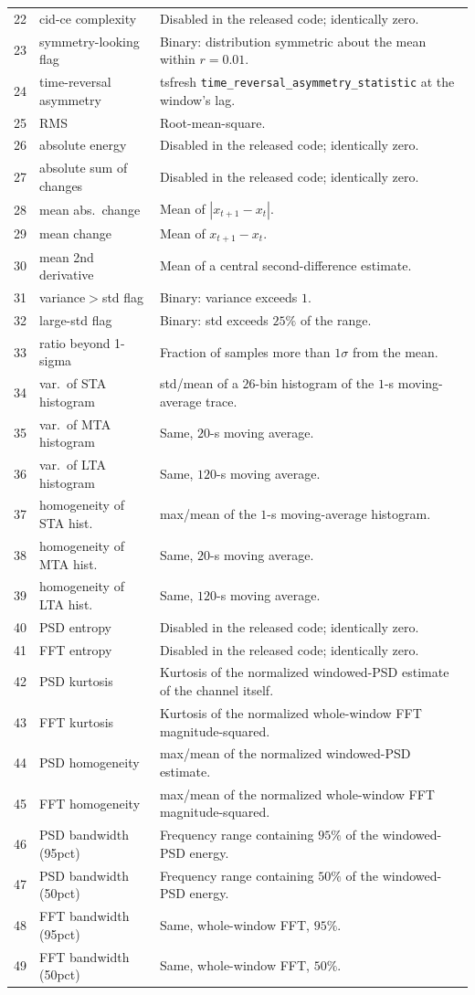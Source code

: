 \documentclass[11pt,a4paper]{article}
\begin{document}
\begin{longtable}{@{}p{0.5cm}p{5.8cm}p{7.8cm}@{}}
22 & cid-ce complexity & Disabled in the released code; identically zero. \\
23 & symmetry-looking flag & Binary: distribution symmetric about the mean within $r=0.01$. \\
24 & time-reversal asymmetry & tsfresh \texttt{time\_reversal\_asymmetry\_statistic} at the window's lag. \\
25 & RMS & Root-mean-square. \\
26 & absolute energy & Disabled in the released code; identically zero. \\
27 & absolute sum of changes & Disabled in the released code; identically zero. \\
28 & mean abs.\ change & Mean of $|x_{t+1}-x_t|$. \\
29 & mean change & Mean of $x_{t+1}-x_t$. \\
30 & mean 2nd derivative & Mean of a central second-difference estimate. \\
31 & variance$>$std flag & Binary: variance exceeds $1$. \\
32 & large-std flag & Binary: std exceeds $25\%$ of the range. \\
33 & ratio beyond 1-sigma & Fraction of samples more than $1\sigma$ from the mean. \\
34 & var.\ of STA histogram & std/mean of a $26$-bin histogram of the $1$-s moving-average trace. \\
35 & var.\ of MTA histogram & Same, $20$-s moving average. \\
36 & var.\ of LTA histogram & Same, $120$-s moving average. \\
37 & homogeneity of STA hist.\ & max/mean of the $1$-s moving-average histogram. \\
38 & homogeneity of MTA hist.\ & Same, $20$-s moving average. \\
39 & homogeneity of LTA hist.\ & Same, $120$-s moving average. \\
40 & PSD entropy & Disabled in the released code; identically zero. \\
41 & FFT entropy & Disabled in the released code; identically zero. \\
42 & PSD kurtosis & Kurtosis of the normalized windowed-PSD estimate of the channel itself. \\
43 & FFT kurtosis & Kurtosis of the normalized whole-window FFT magnitude-squared. \\
44 & PSD homogeneity & max/mean of the normalized windowed-PSD estimate. \\
45 & FFT homogeneity & max/mean of the normalized whole-window FFT magnitude-squared. \\
46 & PSD bandwidth (95pct) & Frequency range containing $95\%$ of the windowed-PSD energy. \\
47 & PSD bandwidth (50pct) & Frequency range containing $50\%$ of the windowed-PSD energy. \\
48 & FFT bandwidth (95pct) & Same, whole-window FFT, $95\%$. \\
49 & FFT bandwidth (50pct) & Same, whole-window FFT, $50\%$. \\
\bottomrule
\end{longtable}
\end{document}
